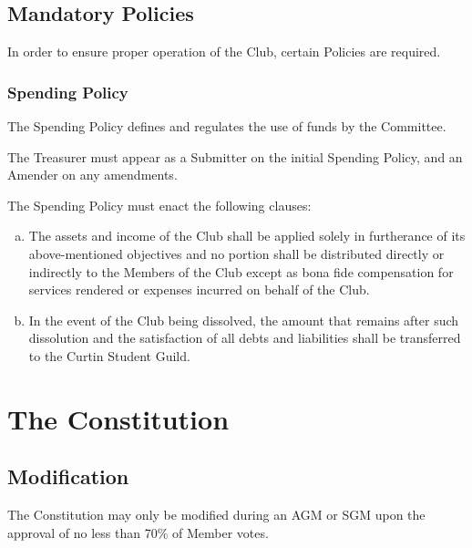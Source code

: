 \documentclass[a4paper,12pt]{article}
\begin{document}
\subsection{Mandatory Policies}

In order to ensure proper operation of the Club, certain Policies are required.

\subsubsection{Spending Policy}

The Spending Policy defines and regulates the use of funds by the Committee.

The Treasurer must appear as a Submitter on the initial Spending Policy, and an Amender on any amendments.

The Spending Policy must enact the following clauses:
\begin{enumerate}[a)]
	\item The assets and income of the Club shall be applied solely in furtherance of its above-mentioned objectives and no portion shall be distributed directly or indirectly to the Members of the Club except as bona fide compensation for services rendered or expenses incurred on behalf of the Club.
	\item In the event of the Club being dissolved, the amount that remains after such dissolution and the satisfaction of all debts and liabilities shall be transferred to the Curtin Student Guild.
\end{enumerate}

\section{The Constitution}

\subsection{Modification}

The Constitution may only be modified during an AGM or SGM upon the approval of no less than 70\% of Member votes.
\end{document}
